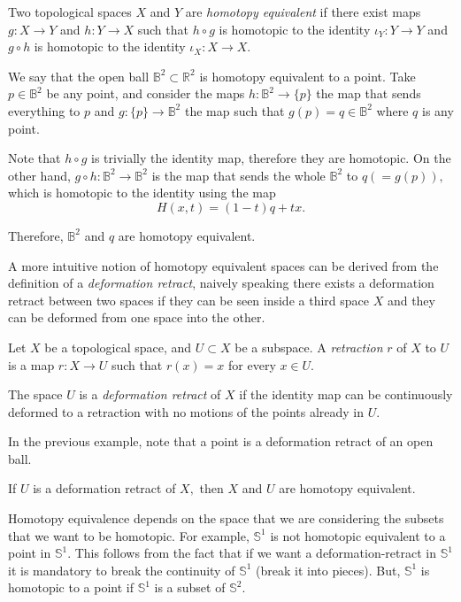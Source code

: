 \documentclass[
	fontsize=10pt, %
	twoside=false, %
	secnumdepth=1, %
]{kaobook}
\begin{document}
 \begin{definition}
 Two topological spaces $X$ and $Y$ are \emph{homotopy equivalent} if there exist maps $g:X\to Y$ and $h:Y\to X$ such that $h\circ g$ is homotopic to the identity $\iota_Y:Y\to Y$ and $g\circ h$ is homotopic to the identity $\iota_X:X\to X.$
 \end{definition}
 
 \begin{example}
We say that the open ball $\mathbb{B}^2\subset \mathbb{R}^2$ is homotopy equivalent to a point. Take $p\in\mathbb{B}^2$ be any point, and consider the maps $h: \mathbb{B}^2\to \{p\}$ the map that sends everything to $p$ and $g: \{p\}\to\mathbb{B}^2$ the map such that $g(p)=q\in\mathbb{B}^2$ where $q$ is any point. 

Note that $h\circ g$ is trivially the identity map, therefore they are homotopic. On the other hand, $g\circ h: \mathbb{B}^2\to\mathbb{B}^2$ is the map that sends the whole $\mathbb{B}^2$ to $q(=g(p)),$ which is homotopic to the identity using the map $$H(x,t)=(1-t)q+tx.$$

Therefore, $\mathbb{B}^2$ and $q$ are homotopy equivalent.
 \end{example}
 
 A more intuitive notion of homotopy equivalent spaces can be derived from the definition of a \emph{deformation retract}, naively speaking there exists a deformation retract between two spaces if they can be seen inside a third space $X$ and they can be deformed from one space into the other.
 
 
  \begin{definition}
  Let $X$ be a topological space, and $U\subset X$ be a subspace. A \emph{retraction} $r$ of $X$ to $U$ is a map $r:X\to U$ such that $r(x)=x$ for every $x\in U.$
  
 The space $U$ is a \emph{deformation retract} of $X$ if the identity map can be continuously deformed to a retraction with no motions of the points already in $U.$
  \end{definition}
  
  In the previous example, note that a point is a deformation retract of an open ball.
 
 \begin{remark}
 If $U$ is a deformation retract of $X,$ then $X$ and $U$ are homotopy equivalent.
 \end{remark}
 
 Homotopy equivalence depends on the space that we are considering the subsets that we want to be homotopic. For example, $\mathbb{S}^1$ is not homotopic equivalent to a point in $\mathbb{S}^1.$ This follows from the fact that if we want a deformation-retract in $\mathbb{S}^1$ it is mandatory to break the continuity of $\mathbb{S}^1$ (break it into pieces).  But, $\mathbb{S}^1$ is homotopic to a point if $\mathbb{S}^1$ is a subset of $\mathbb{S}^2.$
 
\end{document}
